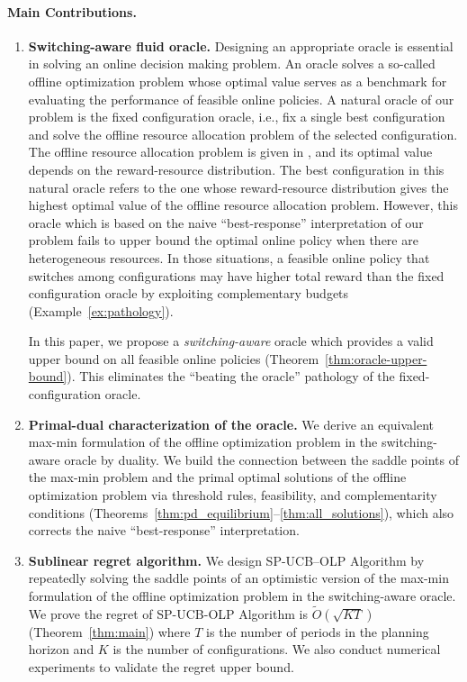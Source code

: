 \documentclass[11pt]{article}
\begin{document}
\paragraph{Main Contributions.}
\begin{enumerate}[leftmargin=*,noitemsep]
\item \textbf{Switching-aware fluid oracle.} Designing an appropriate oracle is essential in solving an online decision making problem. An oracle solves a so-called offline optimization problem whose optimal value serves as a benchmark for evaluating the performance of feasible online policies. A natural oracle of our problem is the fixed configuration oracle, i.e., fix a single best configuration and solve the offline resource allocation problem of the selected configuration. The offline resource allocation problem is given in \cite{li2022online}, and its optimal value depends on the reward-resource distribution. The best configuration in this natural oracle refers to the one whose reward-resource distribution gives the highest optimal value of the offline resource allocation problem. However, this oracle which is based on the naive ``best-response'' interpretation of our problem fails to upper bound the optimal online policy when there are heterogeneous resources. In those situations, a feasible online policy that switches among configurations may have higher total reward than the fixed configuration oracle by exploiting complementary budgets (Example~\ref{ex:pathology}).

\quad In this paper, we propose a \emph{switching-aware} oracle which provides a valid upper bound on all feasible online policies (Theorem~\ref{thm:oracle-upper-bound}). This eliminates the ``beating the oracle'' pathology of the fixed-configuration oracle. \\

\item \textbf{Primal-dual characterization of the oracle.} We derive an equivalent max-min formulation of the offline optimization problem in the switching-aware oracle by duality. We build the connection between the saddle points of the max-min problem and the primal optimal solutions of the offline optimization problem via threshold rules, feasibility, and complementarity conditions (Theorems~\ref{thm:pd_equilibrium}--\ref{thm:all_solutions}), which also corrects the naive ``best-response'' interpretation.\\

\item \textbf{Sublinear regret algorithm.} We design SP-UCB--OLP Algorithm by repeatedly solving the saddle points of an optimistic version of the max-min formulation of the offline optimization problem in the switching-aware oracle. We prove the regret of SP-UCB-OLP Algorithm is $\tilde{O}(\sqrt{KT})$ (Theorem~\ref{thm:main}) where $T$ is the number of periods in the planning horizon and $K$ is the number of configurations. We also conduct numerical experiments to validate the regret upper bound. 
\end{enumerate}
\end{document}

